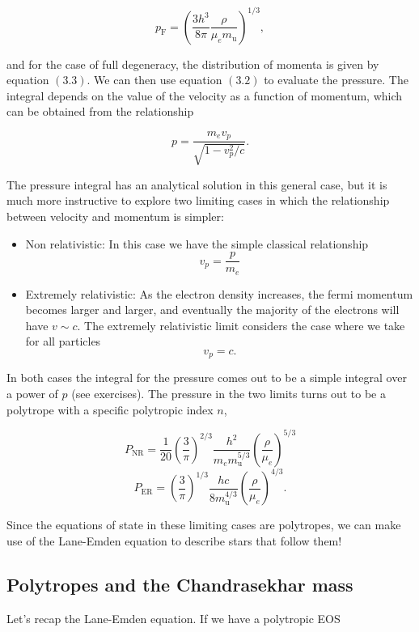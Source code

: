 \documentclass[twocolumn]{article}
\providecommand{\tightlist}{%
  \setlength{\itemsep}{0pt}\setlength{\parskip}{0pt}}
\begin{document}
\[p_\mathrm{F}=\left(\frac{3h^3}{8\pi}\frac{\rho}{\mu_e m_\mathrm{u}}\right)^{1/3},\]

and for the case of full degeneracy, the distribution of momenta is
given by equation \((3.3)\). We can then use equation \((3.2)\) to
evaluate the pressure. The integral depends on the value of the velocity
as a function of momentum, which can be obtained from the relationship

\[p = \frac{m_e v_p}{\sqrt{1-v_p^2/c}}.\]

The pressure integral has an analytical solution in this general case,
but it is much more instructive to explore two limiting cases in which
the relationship between velocity and momentum is simpler:

\begin{itemize}
\tightlist
\item
  Non relativistic: In this case we have the simple classical
  relationship \[\displaystyle v_p=\frac{p}{m_e}\]
\item
  Extremely relativistic: As the electron density increases, the fermi
  momentum becomes larger and larger, and eventually the majority of the
  electrons will have \(v\sim c\). The extremely relativistic limit
  considers the case where we take for all particles \[v_p = c.\]
\end{itemize}

In both cases the integral for the pressure comes out to be a simple
integral over a power of \(p\) (see exercises). The pressure in the two
limits turns out to be a polytrope with a specific polytropic index
\(n\),

\[P_\mathrm{NR} = \frac{1}{20}\left(\frac{3}{\pi}\right)^{2/3}\frac{h^2}{m_e m_\mathrm{u}^{5/3}}\left(\frac{\rho}{\mu_e}\right)^{5/3}\tag{n=3/2}\]
\[P_\mathrm{ER}=\left(\frac{3}{\pi}\right)^{1/3}\frac{hc}{8m_\mathrm{u}^{4/3}}\left(\frac{\rho}{\mu_e}\right)^{4/3}\tag{n=3}.\]

Since the equations of state in these limiting cases are polytropes, we
can make use of the Lane-Emden equation to describe stars that follow
them!

\hypertarget{polytropes-and-the-chandrasekhar-mass}{%
\subsection{Polytropes and the Chandrasekhar
mass}\label{polytropes-and-the-chandrasekhar-mass}}

Let's recap the Lane-Emden equation. If we have a polytropic EOS
\end{document}
